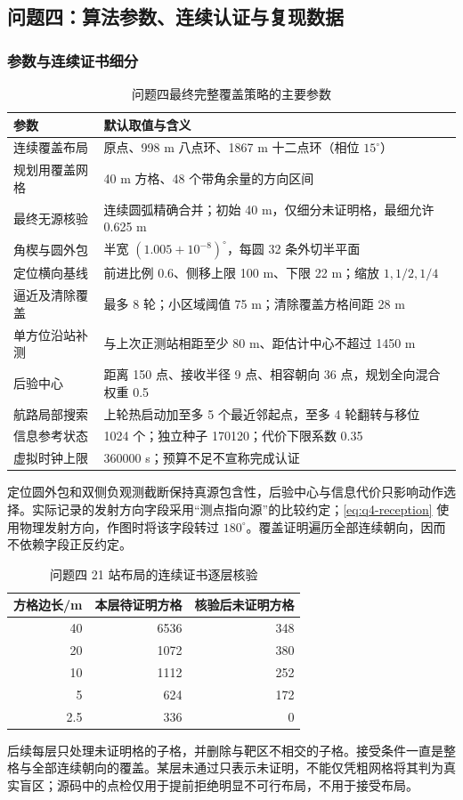 \subsection{问题四：算法参数、连续认证与复现数据}\label{app:q4repro}
\subsubsection{参数与连续证书细分}
\begin{table}[H]\centering
\caption{问题四最终完整覆盖策略的主要参数}
\begin{tabular}{@{}p{}p{}@{}}\toprule
参数 & 默认取值与含义\\\midrule
连续覆盖布局 & 原点、998 m 八点环、1867 m 十二点环（相位 $15^\circ$）\\
规划用覆盖网格 & 40 m 方格、48 个带角余量的方向区间\\
最终无源核验 & 连续圆弧精确合并；初始 40 m，仅细分未证明格，最细允许 0.625 m\\
角楔与圆外包 & 半宽 $(1.005+10^{-8})^\circ$，每圆 32 条外切半平面\\
定位横向基线 & 前进比例 0.6、侧移上限 100 m、下限 22 m；缩放 $1,1/2,1/4$\\
逼近及清除覆盖 & 最多 8 轮；小区域阈值 75 m；清除覆盖方格间距 28 m\\
单方位沿站补测 & 与上次正测站相距至少 80 m、距估计中心不超过 1450 m\\
后验中心 & 距离 150 点、接收半径 9 点、相容朝向 36 点，规划全向混合权重 0.5\\
航路局部搜索 & 上轮热启动加至多 5 个最近邻起点，至多 4 轮翻转与移位\\
信息参考状态 & 1024 个；独立种子 170120；代价下限系数 0.35\\
虚拟时钟上限 & 360000 s；预算不足不宣称完成认证\\\bottomrule
\end{tabular}\end{table}

定位圆外包和双侧负观测截断保持真源包含性，后验中心与信息代价只影响动作选择。实际记录的发射方向字段采用“测点指向源”的比较约定；\cref{eq:q4-reception} 使用物理发射方向，作图时将该字段转过 $180^\circ$。覆盖证明遍历全部连续朝向，因而不依赖字段正反约定。

\begin{table}[H]\centering
\caption{问题四 21 站布局的连续证书逐层核验}
\begin{tabular}{@{}rrr@{}}\toprule
方格边长/m & 本层待证明方格 & 核验后未证明方格\\\midrule
40 & 6536 & 348\\
20 & 1072 & 380\\
10 & 1112 & 252\\
5 & 624 & 172\\
2.5 & 336 & 0\\\bottomrule
\end{tabular}\end{table}
后续每层只处理未证明格的子格，并删除与靶区不相交的子格。接受条件一直是整格与全部连续朝向的覆盖。某层未通过只表示未证明，不能仅凭粗网格将其判为真实盲区；源码中的点检仅用于提前拒绝明显不可行布局，不用于接受布局。

